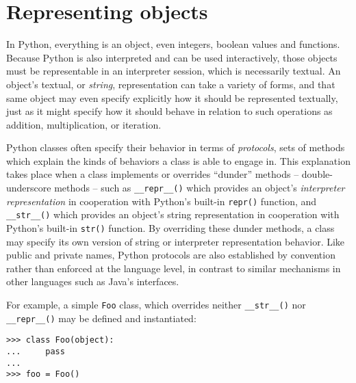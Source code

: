 \section{Representing objects}
\label{sec:representing-objects}

In Python, everything is an object, even integers, boolean values and
functions. Because Python is also interpreted and can be used interactively,
those objects must be representable in an interpreter session, which is
necessarily textual. An object's textual, or \emph{string}, representation can
take a variety of forms, and that same object may even specify explicitly how
it should be represented textually, just as it might specify how it should
behave in relation to such operations as addition, multiplication, or
iteration.

Python classes often specify their behavior in terms of \emph{protocols}, sets
of methods which explain the kinds of behaviors a class is able to engage in.
This explanation takes place when a class implements or overrides
\enquote{dunder} methods -- double-underscore methods -- such as
\texttt{\_\_repr\_\_()} which provides an object's \emph{interpreter
representation} in cooperation with Python's built-in \texttt{repr()} function,
and \texttt{\_\_str\_\_()} which provides an object's string representation in
cooperation with Python's built-in \texttt{str()} function. By overriding these
dunder methods, a class may specify its own version of string or interpreter
representation behavior. Like public and private names, Python protocols are
also established by convention rather than enforced at the language level, in
contrast to similar mechanisms in other languages such as Java's interfaces.

For example, a simple \texttt{Foo} class, which overrides neither
\texttt{\_\_str\_\_()} nor \texttt{\_\_repr\_\_()} may be defined and
instantiated:

\begin{comment}
<abjad>
class Foo(object):
    pass

foo = Foo()
</abjad>
\end{comment}

\begin{abjadbookoutput}
\begin{singlespacing}
\vspace{-0.5\baselineskip}
\begin{verbatim}
>>> class Foo(object):
...     pass
...
>>> foo = Foo()
\end{verbatim}
\end{singlespacing}
\end{abjadbookoutput}

